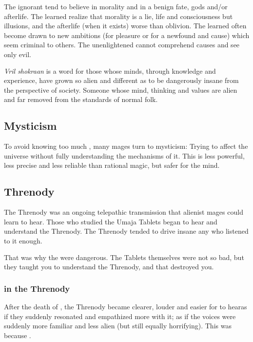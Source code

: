 The ignorant tend to believe in morality and in a benign fate, gods and/or afterlife. The learned realize that morality is a lie, life and consciousness but illusions, and the afterlife (when it exists) worse than oblivion. The learned often become drawn to new ambitions (for pleasure or for a newfound and  cause) which seem criminal to others. The unenlightened cannot comprehend  causes and see only evil. 

%
\emph{Vril shokraan} is a  word for those whose minds, through knowledge and experience, have grown so alien and different as to be dangerously insane from the perspective of society. 
Someone whose mind, thinking and values are alien and far removed from the standards of normal folk.










\subsection{Mysticism}
%
To avoid knowing too much , many mages turn to mysticism: 
Trying to affect the universe without fully understanding the mechanisms of it. 
This is less powerful, less precise and less reliable than rational magic, but safer for the mind. 









\subsection{Threnody}
%
The Threnody was an ongoing telepathic transmission that alienist mages could learn to hear. 
Those who studied the Umaja Tablets began to hear and understand the Threnody. 
The Threnody tended to drive insane any who listened to it enough. 

That was why the  were dangerous. 
The Tablets themselves were not so bad, but they taught you to understand the Threnody, and that destroyed you.





\subsubsection{\Sethicus in the Threnody}
After the death of \Sethicus, the Threnody became clearer, louder and easier for \Miithians to hear\dash as if they suddenly resonated and empathized more with it; as if the voices were suddenly more familiar and less alien (but still equally horrifying). 
This was because .

